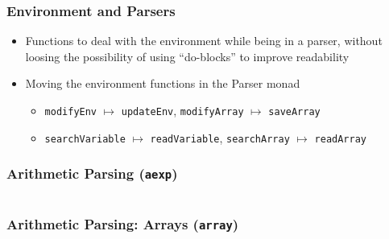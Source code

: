 \documentclass{beamer}
\begin{document}
\begin{frame}
	\frametitle{Environment and Parsers}
	\begin{itemize}
		\footnotesize
		\item Functions to deal with the environment while being in a parser,
			without loosing the possibility of using ``do-blocks'' to improve
			readability
		\item Moving the environment functions in the Parser monad
			\begin{itemize}
				\item \lstinline{modifyEnv} $\mapsto$ \lstinline{updateEnv},
					\lstinline{modifyArray} $\mapsto$ \lstinline{saveArray}
				\item \lstinline{searchVariable} $\mapsto$ \lstinline{readVariable},
					\lstinline{searchArray} $\mapsto$ \lstinline{readArray}
			\end{itemize}
	\end{itemize}
	
	
	
	
\end{frame}

\begin{frame}
	\frametitle{Arithmetic Parsing (\texttt{aexp})}
	\begin{columns}
		
		
		
	\end{columns}
\end{frame}

\begin{frame}
	\frametitle{Arithmetic Parsing: Arrays (\texttt{array})}
	\begin{columns}
		\column{0.4\textwidth}
		
		\column{0.4\textwidth}
		
		
	\end{columns}
\end{frame}
\end{document}
